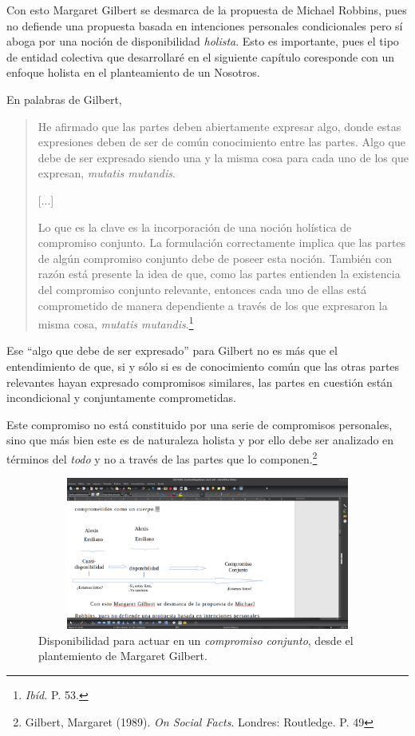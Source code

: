 \documentclass[oneside]{book}
\begin{document}
Con esto Margaret Gilbert se desmarca de la propuesta de Michael Robbins, pues no defiende una propuesta basada en intenciones personales condicionales pero sí aboga por una noción de disponibilidad \textit{holista}. Esto es importante, pues el tipo de entidad colectiva que desarrollaré en el siguiente capítulo coresponde con un enfoque holista en el planteamiento de un Nosotros.

En palabras de Gilbert,

\begin{quotation}
    He afirmado que las partes deben abiertamente expresar algo, donde estas expresiones deben de ser de común conocimiento entre las partes. Algo que debe de ser expresado siendo una y la misma cosa para cada uno de los que expresan, \textit{mutatis mutandis}. 

[...]

Lo que es la clave es la incorporación de una noción holística de compromiso conjunto. La formulación correctamente implica que las partes de algún compromiso conjunto debe de poseer esta noción. También con razón está presente la idea de que, como las partes entienden la existencia del compromiso conjunto relevante, entonces cada uno de ellas está comprometido de manera dependiente a través de los que expresaron la misma cosa, \textit{mutatis mutandis}.\footnote{\textit{Ibíd.} P. 53.}

\end{quotation}

Ese “algo que debe de ser expresado” para Gilbert no es más que el entendimiento de que, si y sólo si es de conocimiento común que las otras partes relevantes hayan expresado compromisos similares, las partes en cuestión están incondicional y conjuntamente comprometidas.

Este compromiso no está constituido por una serie de compromisos personales, sino que más bien este es de naturaleza holista y por ello debe ser analizado en términos del \textit{todo} y no a través de las partes que lo componen.\footnote{Gilbert, Margaret (1989). \textit{On Social Facts}. Londres: Routledge. P. 49} 
\begin{figure}[h]
	\centering
    \includegraphics[width=12cm, height=5cm]{img/esquema_2}
    \caption{Disponibilidad para actuar en un \textit{compromiso conjunto}, desde el plantemiento de Margaret Gilbert.}
\end{figure}
\end{document}
